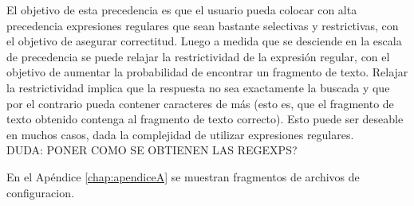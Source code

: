 El objetivo de esta precedencia es que el usuario pueda colocar con alta precedencia expresiones regulares que sean bastante selectivas y restrictivas, con el objetivo de asegurar correctitud. Luego a medida que se desciende en la escala de precedencia se puede relajar la restrictividad de la expresión regular, con el objetivo de aumentar la probabilidad de encontrar un fragmento de texto. Relajar la restrictividad implica que la respuesta no sea exactamente la buscada y que por el contrario pueda contener caracteres de más (esto es, que el fragmento de texto obtenido contenga al fragmento de texto correcto). Esto puede ser deseable en muchos casos, dada la complejidad de utilizar expresiones regulares.  \\

DUDA: PONER COMO SE OBTIENEN LAS REGEXPS?

En el Apéndice \ref{chap:apendiceA} se muestran fragmentos de archivos de configuracion. \\
